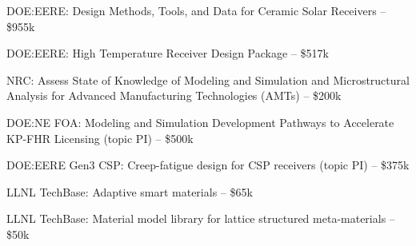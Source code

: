 DOE:EERE: Design Methods, Tools, and Data for Ceramic Solar Receivers -- \$955k 

DOE:EERE: High Temperature Receiver Design Package -- \$517k 

NRC: Assess State of Knowledge of Modeling and Simulation and Microstructural Analysis for Advanced Manufacturing Technologies (AMTs) -- \$200k 

DOE:NE FOA: Modeling and Simulation Development Pathways to Accelerate KP-FHR Licensing (topic PI) -- \$500k 

DOE:EERE Gen3 CSP: Creep-fatigue design for CSP receivers (topic PI) -- \$375k 

LLNL TechBase: Adaptive smart materials -- \$65k 

LLNL TechBase: Material model library for lattice structured meta-materials
-- \$50k 

\extra


\nocite{*}


\printbibliography[keyword=refereed,heading=none]


\printbibliography[keyword=pending,heading=none]


\printbibliography[keyword=conf,heading=none]


\printbibliography[keyword=patents,heading=none]


\printbibliography[keyword=nonref,heading=none]


\printbibliography[keyword=invited,heading=none]



